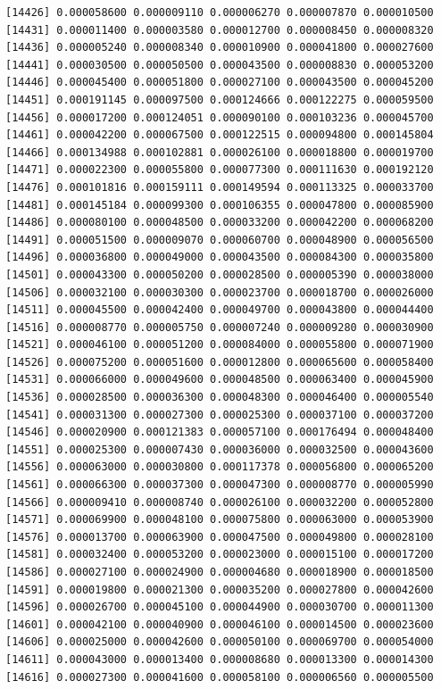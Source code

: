 \documentclass[]{article}
\begin{document}
\begin{verbatim}
[14426] 0.000058600 0.000009110 0.000006270 0.000007870 0.000010500
[14431] 0.000011400 0.000003580 0.000012700 0.000008450 0.000008320
[14436] 0.000005240 0.000008340 0.000010900 0.000041800 0.000027600
[14441] 0.000030500 0.000050500 0.000043500 0.000008830 0.000053200
[14446] 0.000045400 0.000051800 0.000027100 0.000043500 0.000045200
[14451] 0.000191145 0.000097500 0.000124666 0.000122275 0.000059500
[14456] 0.000017200 0.000124051 0.000090100 0.000103236 0.000045700
[14461] 0.000042200 0.000067500 0.000122515 0.000094800 0.000145804
[14466] 0.000134988 0.000102881 0.000026100 0.000018800 0.000019700
[14471] 0.000022300 0.000055800 0.000077300 0.000111630 0.000192120
[14476] 0.000101816 0.000159111 0.000149594 0.000113325 0.000033700
[14481] 0.000145184 0.000099300 0.000106355 0.000047800 0.000085900
[14486] 0.000080100 0.000048500 0.000033200 0.000042200 0.000068200
[14491] 0.000051500 0.000009070 0.000060700 0.000048900 0.000056500
[14496] 0.000036800 0.000049000 0.000043500 0.000084300 0.000035800
[14501] 0.000043300 0.000050200 0.000028500 0.000005390 0.000038000
[14506] 0.000032100 0.000030300 0.000023700 0.000018700 0.000026000
[14511] 0.000045500 0.000042400 0.000049700 0.000043800 0.000044400
[14516] 0.000008770 0.000005750 0.000007240 0.000009280 0.000030900
[14521] 0.000046100 0.000051200 0.000084000 0.000055800 0.000071900
[14526] 0.000075200 0.000051600 0.000012800 0.000065600 0.000058400
[14531] 0.000066000 0.000049600 0.000048500 0.000063400 0.000045900
[14536] 0.000028500 0.000036300 0.000048300 0.000046400 0.000005540
[14541] 0.000031300 0.000027300 0.000025300 0.000037100 0.000037200
[14546] 0.000020900 0.000121383 0.000057100 0.000176494 0.000048400
[14551] 0.000025300 0.000007430 0.000036000 0.000032500 0.000043600
[14556] 0.000063000 0.000030800 0.000117378 0.000056800 0.000065200
[14561] 0.000066300 0.000037300 0.000047300 0.000008770 0.000005990
[14566] 0.000009410 0.000008740 0.000026100 0.000032200 0.000052800
[14571] 0.000069900 0.000048100 0.000075800 0.000063000 0.000053900
[14576] 0.000013700 0.000063900 0.000047500 0.000049800 0.000028100
[14581] 0.000032400 0.000053200 0.000023000 0.000015100 0.000017200
[14586] 0.000027100 0.000024900 0.000004680 0.000018900 0.000018500
[14591] 0.000019800 0.000021300 0.000035200 0.000027800 0.000042600
[14596] 0.000026700 0.000045100 0.000044900 0.000030700 0.000011300
[14601] 0.000042100 0.000040900 0.000046100 0.000014500 0.000023600
[14606] 0.000025000 0.000042600 0.000050100 0.000069700 0.000054000
[14611] 0.000043000 0.000013400 0.000008680 0.000013300 0.000014300
[14616] 0.000027300 0.000041600 0.000058100 0.000006560 0.000005500

\end{verbatim}
\end{document}
